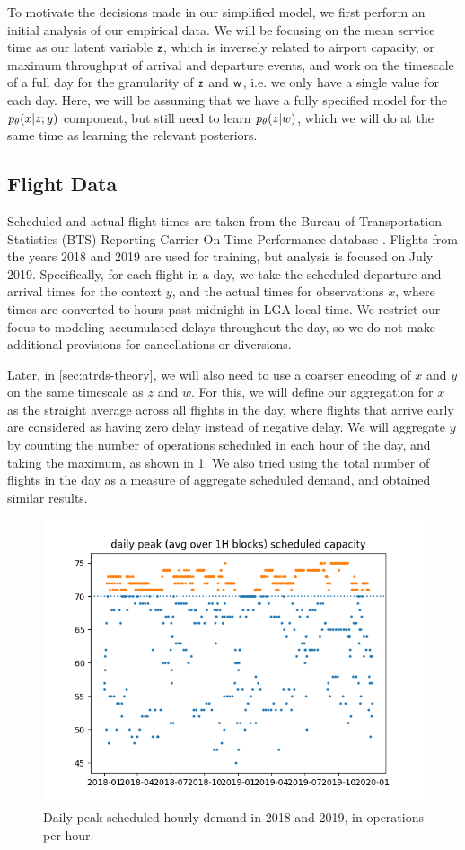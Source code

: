 To motivate the decisions made in our simplified model, we first perform an initial analysis of our empirical data. We will be focusing on the mean service time as our latent variable $\mathsf z$, which is inversely related to airport capacity, or maximum throughput of arrival and departure events, and work on the timescale of a full day for the granularity of $\mathsf z$ and $\mathsf w$, i.e. we only have a single value for each day. Here, we will be assuming that we have a fully specified model for the $\pld{x\given z;y}$ component, but still need to learn $\pld{z\given w}$, which we will do at the same time as learning the relevant posteriors.

\subsection{Flight Data}
Scheduled and actual flight times are taken from the Bureau of Transportation Statistics (BTS) Reporting Carrier On-Time Performance database \cite{bts_transstats_nodate}. Flights from the years 2018 and 2019 are used for training, but analysis is focused on July 2019. Specifically, for each flight in a day, we take the scheduled departure and arrival times for the context $y$, and the actual times for observations $x$, where times are converted to hours past midnight in LGA local time. We restrict our focus to modeling accumulated delays throughout the day, so we do not make additional provisions for cancellations or diversions.

Later, in \cref{sec:atrds-theory}, we will also need to use a coarser encoding of $x$ and $y$ on the same timescale as $z$ and $w$. For this, we will define our aggregation for $x$ as the straight average across all flights in the day, where flights that arrive early are considered as having zero delay instead of negative delay. We will aggregate $y$ by counting the number of operations scheduled in each hour of the day, and taking the maximum, as shown in \cref{fig:split-scheduled-capacity}. We also tried using the total number of flights in the day as a measure of aggregate scheduled demand, and obtained similar results.

\begin{figure}[htb!]
    \centering
    \includegraphics[width=0.8\linewidth]{media/lga-analysis-14.png}
    \caption{Daily peak scheduled hourly demand in 2018 and 2019, in operations per hour.}
    \label{fig:split-scheduled-capacity}
\end{figure}

